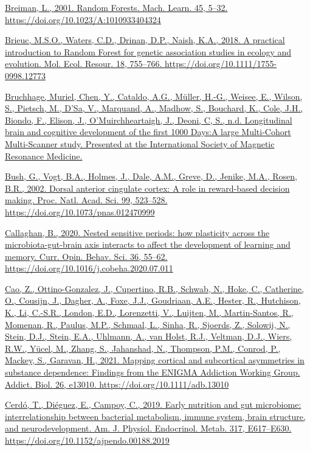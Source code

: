 \documentclass[
]{article}
\begin{document}
\href{https://www.zotero.org/google-docs/?uydJ8e}{Breiman, L., 2001.
Random Forests. Mach. Learn. 45, 5--32.
https://doi.org/10.1023/A:1010933404324}

\href{https://www.zotero.org/google-docs/?uydJ8e}{Brieuc, M.S.O.,
Waters, C.D., Drinan, D.P., Naish, K.A., 2018. A practical introduction
to Random Forest for genetic association studies in ecology and
evolution. Mol. Ecol. Resour. 18, 755--766.
https://doi.org/10.1111/1755-0998.12773}

\href{https://www.zotero.org/google-docs/?uydJ8e}{Bruchhage, Muriel,
Chen, Y., Cataldo, A.G., Müller, H.-G., Weisee, E., Wilson, S., Pietsch,
M., D'Sa, V., Marquand, A., Madhow, S., Bouchard, K., Cole, J.H.,
Biondo, F., Elison, J., O'Muirchheartaigh, J., Deoni, C, S., n.d.
Longitudinal brain and cognitive development of the first 1000 Days:A
large Multi-Cohort Multi-Scanner study. Presented at the International
Society of Magnetic Resonance Medicine.}

\href{https://www.zotero.org/google-docs/?uydJ8e}{Bush, G., Vogt, B.A.,
Holmes, J., Dale, A.M., Greve, D., Jenike, M.A., Rosen, B.R., 2002.
Dorsal anterior cingulate cortex: A role in reward-based decision
making. Proc. Natl. Acad. Sci. 99, 523--528.
https://doi.org/10.1073/pnas.012470999}

\href{https://www.zotero.org/google-docs/?uydJ8e}{Callaghan, B., 2020.
Nested sensitive periods: how plasticity across the microbiota-gut-brain
axis interacts to affect the development of learning and memory. Curr.
Opin. Behav. Sci. 36, 55--62.
https://doi.org/10.1016/j.cobeha.2020.07.011}

\href{https://www.zotero.org/google-docs/?uydJ8e}{Cao, Z.,
Ottino-Gonzalez, J., Cupertino, R.B., Schwab, N., Hoke, C., Catherine,
O., Cousijn, J., Dagher, A., Foxe, J.J., Goudriaan, A.E., Hester, R.,
Hutchison, K., Li, C.-S.R., London, E.D., Lorenzetti, V., Luijten, M.,
Martin-Santos, R., Momenan, R., Paulus, M.P., Schmaal, L., Sinha, R.,
Sjoerds, Z., Solowij, N., Stein, D.J., Stein, E.A., Uhlmann, A., van
Holst, R.J., Veltman, D.J., Wiers, R.W., Yücel, M., Zhang, S.,
Jahanshad, N., Thompson, P.M., Conrod, P., Mackey, S., Garavan, H.,
2021. Mapping cortical and subcortical asymmetries in substance
dependence: Findings from the ENIGMA Addiction Working Group. Addict.
Biol. 26, e13010. https://doi.org/10.1111/adb.13010}

\href{https://www.zotero.org/google-docs/?uydJ8e}{Cerdó, T., Diéguez,
E., Campoy, C., 2019. Early nutrition and gut microbiome:
interrelationship between bacterial metabolism, immune system, brain
structure, and neurodevelopment. Am. J. Physiol. Endocrinol. Metab. 317,
E617--E630. https://doi.org/10.1152/ajpendo.00188.2019}
\end{document}
